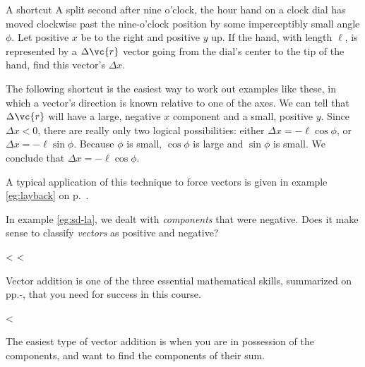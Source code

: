 \begin{eg}{A shortcut}\label{eg:component-shortcut}
\egquestion A split second after nine o'clock, the hour hand on a clock dial
has moved clockwise past the nine-o'clock position by some imperceptibly small
angle $\phi$. Let positive $x$ be to the right and positive $y$ up.
If the hand, with length $\ell$, is represented by a $\Delta\vc{r}$ vector
going from the dial's center to the tip of the hand,
find this vector's $\Delta x$.

\eganswer The following shortcut is the easiest way to work out examples like
these, in which a vector's direction is known relative to one of the axes.
We can tell that $\Delta\vc{r}$ will have a large, negative $x$ component
and a small, positive $y$.
Since $\Delta x<0$,  there are really only
two logical possibilities: either $\Delta x = -\ell \cos\phi$, or
$\Delta x = -\ell \sin\phi$. Because $\phi$ is small, $\cos\phi$ is large
and $\sin\phi$ is small. We conclude that $\Delta x = -\ell \cos\phi$.

A typical application of this technique to force vectors is given in
example \ref{eg:layback} on p.~\pageref{eg:layback}.
\end{eg}

\vfill

\startdq

\begin{dq}
In example \ref{eg:sd-la}, we dealt with \emph{components} that
were negative. Does it make sense to classify \emph{vectors} as positive and
negative?
\end{dq}

\vfill

<%
<%

Vector addition is one of the three essential mathematical skills, summarized on pp.\pageref{begin-skills}-\pageref{end-skills},
that you need for success in this course.

\vfill

<%

The easiest type of vector addition is when you are in
possession of the components, and want to find the
components of their sum.

\vfill

